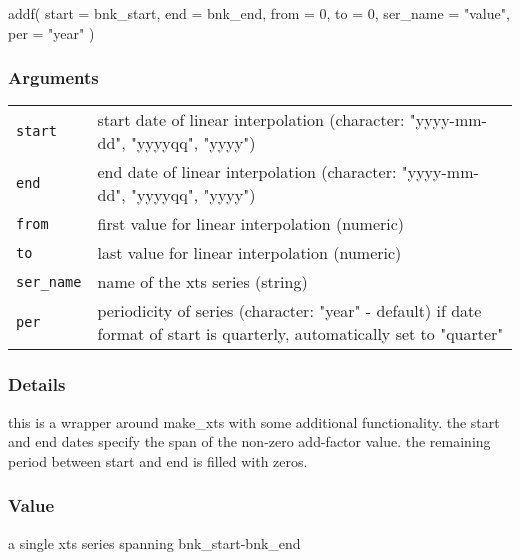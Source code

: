\documentclass[
  letterpaper,
  DIV=11,
  numbers=noendperiod]{scrreport}
\newenvironment{Shaded}{\begin{snugshade}}{\end{snugshade}}
\newcommand{\AttributeTok}[1]{\textcolor[rgb]{0.40,0.45,0.13}{#1}}
\newcommand{\DecValTok}[1]{\textcolor[rgb]{0.68,0.00,0.00}{#1}}
\newcommand{\FunctionTok}[1]{\textcolor[rgb]{0.28,0.35,0.67}{#1}}
\newcommand{\NormalTok}[1]{\textcolor[rgb]{0.00,0.23,0.31}{#1}}
\newcommand{\StringTok}[1]{\textcolor[rgb]{0.13,0.47,0.30}{#1}}
\begin{document}
\begin{Shaded}
\begin{Highlighting}[]
\FunctionTok{addf}\NormalTok{(}
  \AttributeTok{start =}\NormalTok{ bnk\_start,}
  \AttributeTok{end =}\NormalTok{ bnk\_end,}
  \AttributeTok{from =} \DecValTok{0}\NormalTok{,}
  \AttributeTok{to =} \DecValTok{0}\NormalTok{,}
  \AttributeTok{ser\_name =} \StringTok{"value"}\NormalTok{,}
  \AttributeTok{per =} \StringTok{"year"}
\NormalTok{)}
\end{Highlighting}
\end{Shaded}

\subsubsection{Arguments}\label{arguments-4}

\begin{longtable}[]{@{}ll@{}}
\toprule\noalign{}
\endhead
\bottomrule\noalign{}
\endlastfoot
\texttt{start} & start date of linear interpolation (character:
"yyyy-mm-dd", "yyyyqq", "yyyy") \\
\texttt{end} & end date of linear interpolation (character:
"yyyy-mm-dd", "yyyyqq", "yyyy") \\
\texttt{from} & first value for linear interpolation (numeric) \\
\texttt{to} & last value for linear interpolation (numeric) \\
\texttt{ser\_name} & name of the xts series (string) \\
\texttt{per} & periodicity of series (character: "year" - default) if
date format of start is quarterly, automatically set to "quarter" \\
\end{longtable}

\subsubsection{Details}\label{details-4}

this is a wrapper around make\_xts with some additional functionality.
the start and end dates specify the span of the non-zero add-factor
value. the remaining period between start and end is filled with zeros.

\subsubsection{Value}\label{value-4}

a single xts series spanning bnk\_start-bnk\_end
\end{document}
